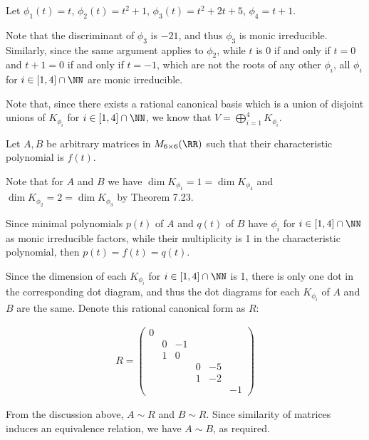\documentclass[11pt]{scrartcl}
\begin{document}
\begin{soln}
  \hfill

  Let $\phi_1(t) = t$, $\phi_2(t) = t^2+1$, $\phi_3(t) = t^2+2t+5$,
  $\phi_4 = t+1$.

  Note that the discriminant of $\phi_3$ is $-21$, and thus $\phi_3$
  is monic irreducible. Similarly, since the same argument applies to
  $\phi_2$, while $t$ is 0 if and only if $t = 0$ and $t+1 = 0$ if and
  only if $t=-1$, which are not the roots of any other $\phi_i$, all
  $\phi_i$ for $i\in[1, 4]\cap \NN$ are monic irreducible.

  Note that, since there exists a rational canonical basis which is a
  union of disjoint unions of $K_{\phi_i}$ for $i\in[1, 4]\cap \NN$,
  we know that $V = \bigoplus_{i=1}^4 K_{\phi_i}$.

  Let $A, B$ be arbitrary matrices in $M_{6\times 6}(\RR)$ such that
  their characteristic polynomial is $f(t)$.

  Note that for $A$ and $B$ we have
  $\dim K_{\phi_1}= 1 = \dim K_{\phi_4}$ and
  $\dim K_{\phi_2} = 2 = \dim K_{\phi_3}$ by Theorem 7.23.

  Since minimal polynomials $p(t)$ of $A$ and $q(t)$ of $B$ have
  $\phi_i$ for $i\in[1, 4]\cap \NN$ as monic irreducible factors,
  while their multiplicity is 1 in the characteristic polynomial, then
  $p(t) = f(t) = q(t)$.

  Since the dimension of each $K_{\phi_i}$ for $i\in[1, 4]\cap \NN$ is
  1, there is only one dot in the corresponding dot diagram, and thus
  the dot diagrams for each $K_{\phi_i}$ of $A$ and $B$ are the
  same. Denote this rational canonical form as $R$:

  \begin{align}
R=  
    \begin{pmatrix}
0 &  &  &  &  &  \\
  & 0&-1&  &  &  \\
  & 1& 0&  &  &  \\
  &  &  &0 &-5&  \\
  &  &  &1 &-2&  \\
  &  &  &  &  & -1
    \end{pmatrix}
  \end{align}

  From the discussion above, $A\sim R$ and $B\sim R$. Since similarity
  of matrices induces an equivalence relation, we have $A\sim B$, as
  required.
\end{soln}
\end{document}

